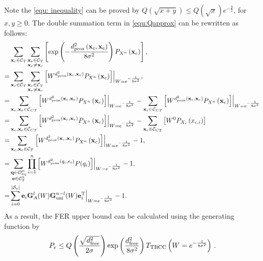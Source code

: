 \documentclass [PhD] {uclathes}
\begin{document}
Note the \eqref{equ: inequality} can be proved by $Q(\sqrt{x+y})\leq Q(\sqrt{x})e^{-\frac{y}{2}}$, for $x,y\geq 0$.
The double summation term in \eqref{equ:Qapprox} can be rewritten as follows:
\begingroup
\allowdisplaybreaks
\begin{align}
    &\sum_{\mathbf{x}_c\in\mathcal{C}_{\mathrm{T}}}\sum_{\substack{\mathbf{x}_e\in\mathcal{C}_{\mathrm{T}}\\\mathbf{x}_e\neq\mathbf{x}_c}} \left[\exp\left(-\frac{d_{\mathrm{prox}}^2\left(\mathbf{x}_{c},\mathbf{x}_{e}\right)}{8\sigma^2}\right)P_{X^n}\left(\mathbf{x}_{c}\right)\right],\\
    =& \sum_{\mathbf{x}_c\in\mathcal{C}_{\mathrm{T}}}\sum_{\substack{\mathbf{x}_e\in\mathcal{C}_{\mathrm{T}}\\\mathbf{x}_e\neq\mathbf{x}_c}} \left[W^{d_{\mathrm{prox}}^2\left(\mathbf{x}_{c},\mathbf{x}_{e}\right)} P_{X^n}\left(\mathbf{x}_{c}\right)\right]\Bigr|_{W=e^{-\frac{1}{8\sigma^2}}},\\
    =& \sum_{\mathbf{x}_c,\mathbf{x}_e\in\mathcal{C}_{CT}} \left[W^{d_{\mathrm{prox}}^2\left(\mathbf{x}_{c},\mathbf{x}_{e}\right)} P_{X^n}\left(\mathbf{x}_{c}\right)\right]\Bigr|_{W=e^{-\frac{1}{8\sigma^2}}}- \sum_{\mathbf{x}_c\in\mathcal{C}_{CT}} \left[W^{d_{\mathrm{prox}}^2\left(\mathbf{x}_{c},\mathbf{x}_{c}\right)} P_{X^n}\left(\mathbf{x}_{c}\right)\right]\Bigr|_{W=e^{-\frac{1}{8\sigma^2}}}\\
    =& \sum_{\mathbf{x}_c,\mathbf{x}_e\in\mathcal{C}_{CT}} \left[W^{d_{\mathrm{prox}}^2\left(\mathbf{x}_{c},\mathbf{x}_{e}\right)} P_{X^n}\left(\mathbf{x}_{c}\right)\right]\Bigr|_{W=e^{-\frac{1}{8\sigma^2}}}- \sum_{\mathbf{x}_c\in\mathcal{C}_{\mathrm{CT}}} \left[W^0 P_{X_i}\left(x_{c,i}\right)\right]\\
    =& \sum_{\mathbf{x}_c,\mathbf{x}_e\in\mathcal{C}_{T}} \left[W^{d_{\mathrm{prox}}^2\left(\mathbf{x}_{c},\mathbf{x}_{e}\right)} P_{X^n}\left(\mathbf{x}_{c}\right)\right]\Bigr|_{W=e^{-\frac{1}{8\sigma^2}}}- 1,\\
    =&\sum_{\substack{\mathbf{q}\in\mathcal{O}_\text{eq}^{n}\\\mathbf{e}\in\mathcal{C}^n_{\mathrm{T}}}}\prod_{i=1}^{n}\left[W^{d_{\mathrm{prox}}^2(q_i,e_i)}P(q_i)\right]\Bigr|_{W=e^{-\frac{1}{8\sigma^2}}}-1,\\
    =& \sum_{i=0}^{|\mathcal{S}_e|} \mathbf{e}_i \mathbf{G}_A^{l}(W)\mathbf{G}_{\text{uni}}^{n-l}(W) \mathbf{e}_i^{\mathrm{T}}\Bigr|_{W=e^{-\frac{1}{8\sigma^2}}}-1.
\end{align}
\endgroup
As a result, the FER upper bound can be calculated using the generating function  by
\begin{align}
    P_e \leq Q\left(\frac{\sqrt{d_{\mathrm{free}}^2}}{2\sigma}\right) \exp\left(\frac{d_{\mathrm{free}}^2}{8\sigma^2}\right)T_{\mathrm{TBCC}}\left(W=e^{-\frac{1}{{8\sigma^2}}}\right)\,.
\end{align}
\end{document}
